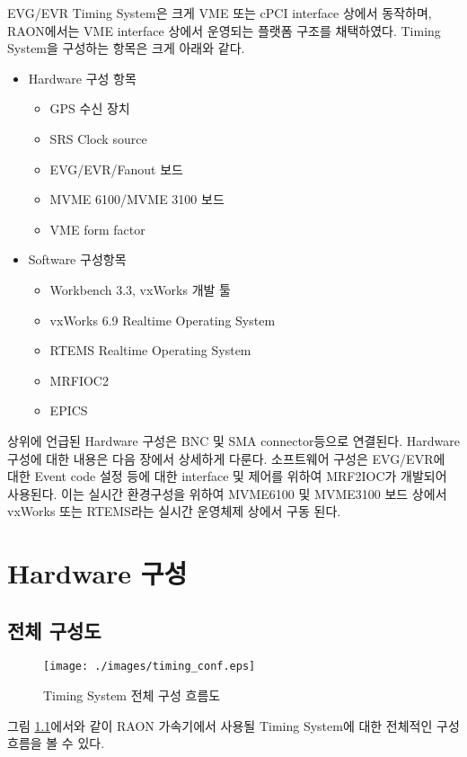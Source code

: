 \documentclass[11pt
  , a4paper
  , article
  , oneside
]{memoir}
\begin{document}
EVG/EVR Timing System은 크게 VME 또는 cPCI interface 상에서 동작하며, RAON에서는 VME interface 상에서 운영되는 플랫폼 구조를 채택하였다. Timing System을 구성하는 항목은 크게 아래와 같다.

\begin{itemize}
	\item Hardware 구성 항목
	\begin{itemize}
		\item GPS 수신 장치
		\item SRS Clock source
		\item EVG/EVR/Fanout 보드
		\item MVME 6100/MVME 3100 보드 
		\item VME form factor		
	\end{itemize}
	\item Software 구성항목
	\begin{itemize}
		\item Workbench 3.3, vxWorks 개발 툴
		\item vxWorks 6.9 Realtime Operating System
		\item RTEMS Realtime Operating System
		\item MRFIOC2  
		\item EPICS		
	\end{itemize}
\end{itemize}

상위에 언급된 Hardware 구성은 BNC 및 SMA connector등으로 연결된다. Hardware 구성에 대한 내용은 다음 장에서 상세하게 다룬다. 소프트웨어 구성은 EVG/EVR에 대한 Event code 설정 등에 대한 interface 및 제어를 위하여 MRF2IOC가 개발되어 사용된다. 이는 실시간 환경구성을 위하여 MVME6100 및 MVME3100 보드 상에서 vxWorks 또는 RTEMS라는 실시간 운영체제 상에서 구동 된다.

\chapter{Hardware 구성}

\clearpage

\section{전체 구성도}
\begin{figure}[h!]
	\centering
	\texttt{[image: ./images/timing\_conf.eps]}
	\caption{Timing System 전체 구성 흐름도}
	\label{fig:timing_conf} 
\end{figure}
 그림 \ref{fig:timing_conf}에서와 같이 RAON 가속기에서 사용될 Timing System에 대한 전체적인 구성 흐름을 볼 수 있다.
 
\end{document}
